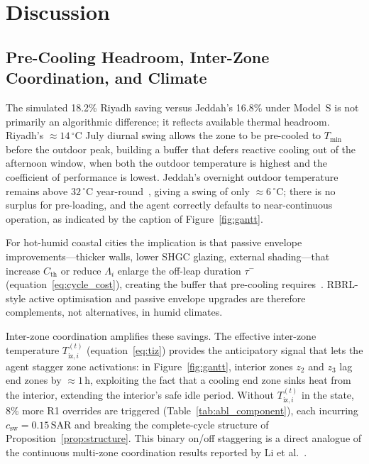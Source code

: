 \documentclass[3p,number]{elsarticle}
\let\oldsection\section
\renewcommand{\section}{\FloatBarrier\oldsection}
\let\oldsubsection\subsection
\renewcommand{\subsection}{\FloatBarrier\oldsubsection}
\newcommand{\Tmin}{T_{\min}}
\newcommand{\Cth}{C_{\mathrm{th}}}
\newcommand{\csw}{c_{\mathrm{sw}}}
\newcommand{\SAR}{\text{SAR}}
\newcommand{\Tiz}[1]{T_{\mathrm{iz},#1}}
\newcommand{\taum}{\tau^{-}}
\begin{document}
\section{Discussion}
\label{sec:discussion}
 
\subsection{Pre-Cooling Headroom, Inter-Zone Coordination, and Climate}
\label{subsec:disc_precool}
 
The simulated 18.2\% Riyadh saving versus Jeddah's 16.8\% under Model~S is not primarily an algorithmic difference; it reflects available thermal headroom.
Riyadh's ${\approx}14\,^\circ$C July diurnal swing allows the zone to be pre-cooled to $\Tmin$ before the outdoor peak, building a buffer that defers reactive cooling out of the afternoon window, when both the outdoor temperature is highest and the coefficient of performance is lowest.
Jeddah's overnight outdoor temperature remains above $32\,^\circ$C year-round~\cite{Rodrigues2025}, giving a swing of only ${\approx}6\,^\circ$C; there is no surplus for pre-loading, and the agent correctly defaults to near-continuous operation, as indicated by the caption of Figure~\ref{fig:gantt}.
 
For hot-humid coastal cities the implication is that passive envelope improvements---thicker walls, lower SHGC glazing, external shading---that increase $\Cth$ or reduce $\Lambda_i$ enlarge the off-leap duration $\taum$ (equation~\eqref{eq:cycle_cost}), creating the buffer that pre-cooling requires~\cite{AlReshidi2024}.
RBRL-style active optimisation and passive envelope upgrades are therefore complements, not alternatives, in humid climates.
 
Inter-zone coordination amplifies these savings.
The effective inter-zone temperature $\Tiz{i}^{(t)}$ (equation~\eqref{eq:tiz}) provides the anticipatory signal that lets the agent stagger zone activations: in Figure~\ref{fig:gantt}, interior zones $z_2$ and $z_3$ lag end zones by ${\approx}1\,\text{h}$, exploiting the fact that a cooling end zone sinks heat from the interior, extending the interior's safe idle period.
Without $\Tiz{i}^{(t)}$ in the state, 8\% more R1 overrides are triggered (Table~\ref{tab:abl_component}), each incurring $\csw=0.15\,\SAR$ and breaking the complete-cycle structure of Proposition~\ref{prop:structure}.
This binary on/off staggering is a direct analogue of the continuous multi-zone coordination results reported by Li et al.~\cite{Li2024MZ}.
 
\end{document}
